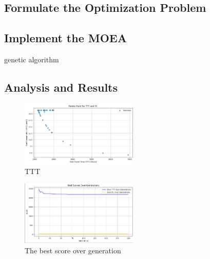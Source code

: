 \subsection{Formulate the Optimization Problem}
\subsection{Implement the MOEA}
genetic algorithm
\subsection{Analysis and Results}
\begin{figure}[h]
    \centering
    \includegraphics[width=0.5\textwidth]{figures/TTT.PNG}
    \caption{TTT}
    \label{fig:Total Travel Time}
\end{figure}

\begin{figure}[h]
    \centering
    \includegraphics[width=0.5\textwidth]{figures/Best_score.PNG}
    \caption{The best score over generation}
    \label{fig:Best Score Over Generation} 
\end{figure}

